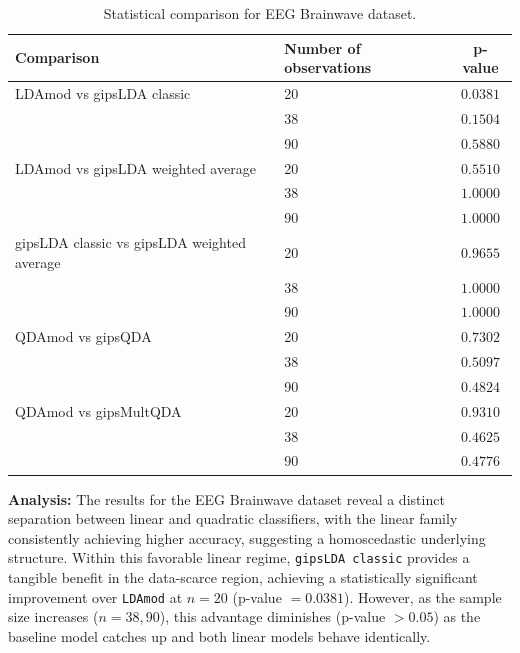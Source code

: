 \documentclass[a4paper,11pt,twoside]{report}
\theoremstyle{definition}
\begin{document}
\begin{table}[H]
    \centering
    \begin{tabular}{llc}
        \toprule
        \textbf{Comparison} & \textbf{Number of observations} & \textbf{p-value} \\
        \midrule
        LDAmod vs gipsLDA classic & 20 & $0.0381$ \\
                                  & 38 & $0.1504$ \\
                                  & 90 & $0.5880$ \\
        \midrule
        LDAmod vs gipsLDA weighted average & 20 & $0.5510$ \\
                                           & 38 & $1.0000$ \\
                                           & 90 & $1.0000$ \\
        \midrule
        gipsLDA classic vs gipsLDA weighted average & 20 & $0.9655$ \\
                                                    & 38 & $1.0000$ \\
                                                    & 90 & $1.0000$ \\
        \midrule
        QDAmod vs gipsQDA & 20 & $0.7302$ \\
                          & 38 & $0.5097$ \\
                          & 90 & $0.4824$ \\
        \midrule
        QDAmod vs gipsMultQDA & 20 & $0.9310$ \\
                              & 38 & $0.4625$ \\
                              & 90 & $0.4776$ \\
        \bottomrule
    \end{tabular}
    \caption{Statistical comparison for EEG Brainwave dataset.}
\end{table}

\textbf{Analysis:}
The results for the EEG Brainwave dataset reveal a distinct separation between linear and quadratic classifiers, with the linear family consistently achieving higher accuracy, suggesting a homoscedastic underlying structure. Within this favorable linear regime, \texttt{gipsLDA classic} provides a tangible benefit in the data-scarce region, achieving a statistically significant improvement over \texttt{LDAmod} at $n=20$ (p-value $= 0.0381$). However, as the sample size increases ($n=38, 90$), this advantage diminishes (p-value $> 0.05$) as the baseline model catches up and both linear models behave identically.
\end{document}
